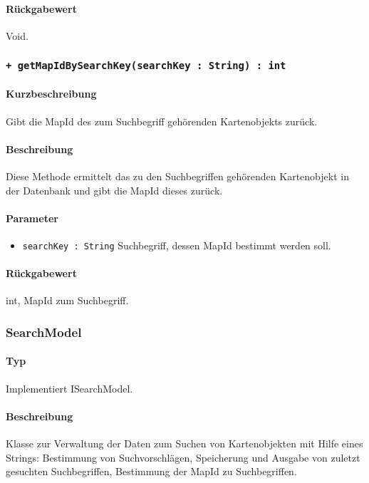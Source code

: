 \paragraph*{Rückgabewert}
Void.

 \subsubsection*{\texttt{+ getMapIdBySearchKey(searchKey : String) : int}}%
\paragraph*{Kurzbeschreibung}
Gibt die MapId des zum Suchbegriff gehörenden Kartenobjekts zurück.
\paragraph*{Beschreibung}
Diese Methode ermittelt das zu den Suchbegriffen gehörenden Kartenobjekt in der Datenbank und gibt die MapId dieses zurück.
\paragraph*{Parameter}
\begin{itemize}
    \item \texttt{searchKey : String} Suchbegriff, dessen MapId bestimmt werden soll.
\end{itemize}
\paragraph*{Rückgabewert}
int, MapId zum Suchbegriff.


\subsubsection{SearchModel}
\paragraph*{Typ}
Implementiert ISearchModel.
\paragraph*{Beschreibung}
Klasse zur Verwaltung der Daten zum Suchen von Kartenobjekten mit Hilfe eines Strings: 
Bestimmung von Suchvorschlägen, Speicherung und Ausgabe von zuletzt gesuchten Suchbegriffen, Bestimmung der MapId zu Suchbegriffen.
